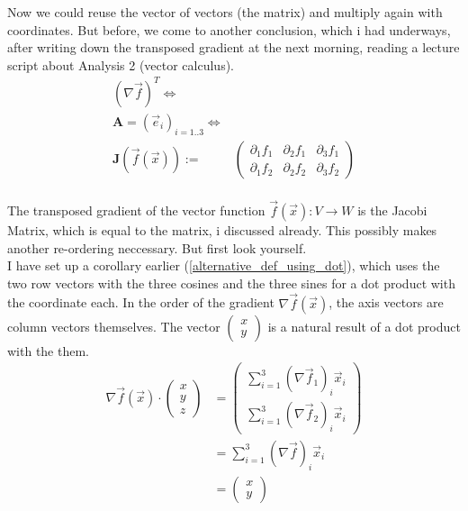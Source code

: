 \documentclass[a4paper]{article}
\begin{document}
Now we could reuse the vector of vectors (the matrix) and multiply again with coordinates. But before, we come to another conclusion, which i had underways, after writing down the transposed gradient at the next morning, reading a lecture script about Analysis 2 (vector calculus).\\
\begin{displaymath}
\begin{align}
(\nabla\vec{f})^{T} \Leftrightarrow &\\ \boldsymbol{A} = (\vec{e}_{i})_{i=1..3} \Leftrightarrow& \\ \boldsymbol{J}(\vec{f}(\vec{x})) :=& \begin{pmatrix}\partial_{1}f_{1} & \partial_{2}f_{1} & \partial_{3}f_{1}\\\partial_{1}f_{2} & \partial_{2}f_{2} & \partial_{3}f_{2}\end{pmatrix}\\
\end{align}
\end{displaymath}

The transposed gradient of the vector function $\vec{f}(\vec{x}) : V \rightarrow W$ is the Jacobi Matrix, which is equal to the matrix, i discussed already. This possibly makes another re-ordering neccessary. But first look yourself.\\

I have set up a corollary earlier (\ref{alternative_def_using_dot}), which uses the two row vectors with the three cosines and the three sines for a dot product with the coordinate each. In the order of the gradient $\nabla\vec{f}(\vec{x})$, the axis vectors are column vectors themselves. The vector $\begin{pmatrix}x\\y\end{pmatrix}$ is a natural result of a dot product with the them.\\

\begin{displaymath}
\begin{align}
\nabla\vec{f}(\vec{x}) \cdot \begin{pmatrix}x\\y\\z\end{pmatrix} &= \begin{pmatrix}\sum_{i=1}^{3}(\nabla\vec{f}_{1})_{i}\vec{x}_{i}\\\sum_{i=1}^{3}(\nabla\vec{f}_{2})_{i}\vec{x}_{i}\end{pmatrix}\\ 
&= \sum_{i=1}^{3}(\nabla\vec{f})_{i}\vec{x}_{i}\\
&= \begin{pmatrix}x\\y\end{pmatrix}
\end{align}
\end{displaymath}
\end{document}
